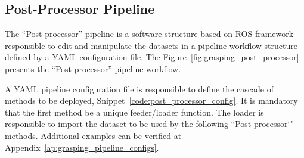 \subsection{Post-Processor Pipeline}
\label{cap4:modular_grasping_architecture:sec:grasping_synthesis:subsec:post_processor}

The ``Post-processor'' pipeline is a software structure based on \ac{ROS} framework responsible to edit and manipulate the datasets in a pipeline workflow structure defined by a YAML configuration file. The Figure~\ref{fig:grasping_post_processor} presents the ``Post-processor'' pipeline workflow.

\begin{figure}[h!]
\end{figure}

A YAML pipeline configuration file is responsible to define the cascade of methods to be deployed, Snippet~\ref{code:post_processor_config}. It is mandatory that the first method be a unique feeder/loader function. The loader is responsible to import the dataset to be used by the following ``Post-processor`" methods. Additional examples can be verified at Appendix~\ref{ap:grasping_pipeline_configs}.

\begin{snippet}[h!]
\centering
{}
\caption{Post-processor pipeline configuration example.}
\label{code:post_processor_config}
\end{snippet}


